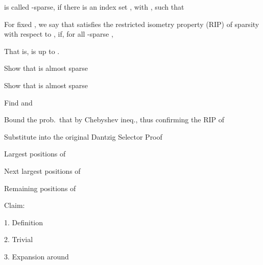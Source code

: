 {
\I {} is called -sparse, if there is an index set , with , such that

\I For fixed , we say that \m {\M{\Phi}} satisfies the restricted isometry property (RIP) of sparsity  with respect to , if, for all -sparse ,

\I That is, \m {\M{\Phi}} is  up to  .
}
{
\I Show that  is almost sparse

\I Show that  is almost sparse

\I Find  and 

\I Bound the prob.\ that  by Chebyshev ineq., thus confirming the RIP of 

\I Substitute  into the original Dantzig Selector Proof
}
{
\I Largest  positions of 

\I Next largest  positions of 

\I Remaining positions of 

\I Claim:
}
{

1. Definition

2. Trivial

3. Expansion around 
}
